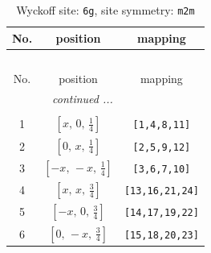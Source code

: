 \documentclass[fleqn,8pt]{jsarticle}
\begin{document}
\renewcommand{\arraystretch}{1.2}
\begin{longtable}{ccc}
\caption{Wyckoff site: {\tt 6g}, site symmetry: {\tt m2m}}
 \\
 \hline \hline
No. & position & mapping \\ \hline \endfirsthead

\multicolumn{2}{l}{\tablename\ \thetable{}} \\
 \hline \hline
No. & position & mapping \\ \hline \endhead

 \hline \hline
\multicolumn{2}{r}{\footnotesize\it continued ...} \\ \endfoot

 \hline \hline
\multicolumn{2}{r}{} \\ \endlastfoot

1 & $\left[ x,\, 0,\, \frac{1}{4} \right]$ & {\tt [1,4,8,11]} \\ \hline
2 & $\left[ 0,\, x,\, \frac{1}{4} \right]$ & {\tt [2,5,9,12]} \\ \hline
3 & $\left[ - x,\, - x,\, \frac{1}{4} \right]$ & {\tt [3,6,7,10]} \\ \hline
4 & $\left[ x,\, x,\, \frac{3}{4} \right]$ & {\tt [13,16,21,24]} \\ \hline
5 & $\left[ - x,\, 0,\, \frac{3}{4} \right]$ & {\tt [14,17,19,22]} \\ \hline
6 & $\left[ 0,\, - x,\, \frac{3}{4} \right]$ & {\tt [15,18,20,23]} \\
\end{longtable}
\renewcommand{\arraystretch}{1.2}
\end{document}
